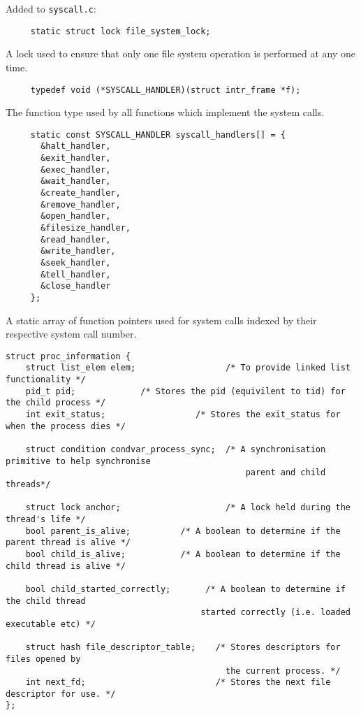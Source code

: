 \documentclass[a4wide, 11pt]{article}
\newcommand{\tab}{\hspace*{2em}}
\newcommand{\tx}{\texttt}
\begin{document}
Added to \tx{syscall.c}:

\begin{verbatim}
     static struct lock file_system_lock;
\end{verbatim}

\tab A lock used to ensure that only one file system operation is performed at any one time.

\begin{verbatim}
     typedef void (*SYSCALL_HANDLER)(struct intr_frame *f);
\end{verbatim}

\tab The function type used by all functions which implement the system calls.

\begin{verbatim}
     static const SYSCALL_HANDLER syscall_handlers[] = {
       &halt_handler,
       &exit_handler,
       &exec_handler,
       &wait_handler,
       &create_handler,
       &remove_handler,
       &open_handler,
       &filesize_handler,
       &read_handler,
       &write_handler,
       &seek_handler,
       &tell_handler,
       &close_handler
     };
\end{verbatim}

\tab A static array of function pointers used for system calls indexed by their respective system call number.

\begin{verbatim}
struct proc_information { 
    struct list_elem elem;                  /* To provide linked list functionality */
    pid_t pid;             /* Stores the pid (equivilent to tid) for the child process */
    int exit_status;                  /* Stores the exit_status for when the process dies */
    
    struct condition condvar_process_sync;  /* A synchronisation primitive to help synchronise 
                                                parent and child threads*/
                                                
    struct lock anchor;                     /* A lock held during the thread's life */
    bool parent_is_alive;          /* A boolean to determine if the parent thread is alive */
    bool child_is_alive;           /* A boolean to determine if the child thread is alive */
    
    bool child_started_correctly;       /* A boolean to determine if the child thread 
                                       started correctly (i.e. loaded executable etc) */
    
    struct hash file_descriptor_table;    /* Stores descriptors for files opened by 
                                            the current process. */ 
    int next_fd;                          /* Stores the next file descriptor for use. */
};
\end{verbatim}
\end{document}
